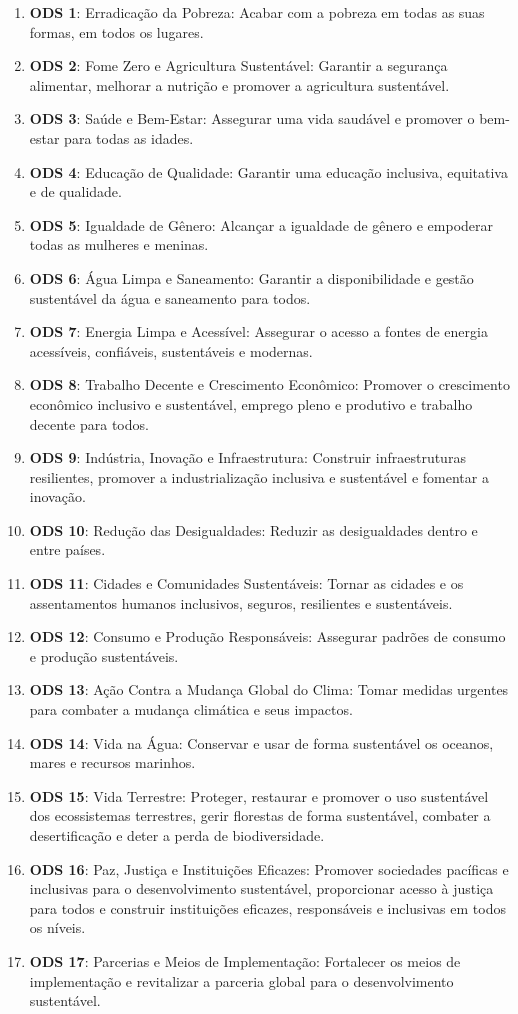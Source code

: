 \begin{enumerate}
    \item \textbf{ODS 1}: Erradicação da Pobreza: Acabar com a pobreza em todas as suas formas, em todos os lugares.
    \item \textbf{ODS 2}: Fome Zero e Agricultura Sustentável: Garantir a segurança alimentar, melhorar a nutrição e promover a agricultura sustentável.
    \item \textbf{ODS 3}: Saúde e Bem-Estar: Assegurar uma vida saudável e promover o bem-estar para todas as idades.
    \item \textbf{ODS 4}: Educação de Qualidade: Garantir uma educação inclusiva, equitativa e de qualidade.
    \item \textbf{ODS 5}: Igualdade de Gênero: Alcançar a igualdade de gênero e empoderar todas as mulheres e meninas.
    \item \textbf{ODS 6}: Água Limpa e Saneamento: Garantir a disponibilidade e gestão sustentável da água e saneamento para todos.
    \item \textbf{ODS 7}: Energia Limpa e Acessível: Assegurar o acesso a fontes de energia acessíveis, confiáveis, sustentáveis e modernas.
    \item \textbf{ODS 8}: Trabalho Decente e Crescimento Econômico: Promover o crescimento econômico inclusivo e sustentável, emprego pleno e produtivo e trabalho decente para todos.
    \item \textbf{ODS 9}: Indústria, Inovação e Infraestrutura: Construir infraestruturas resilientes, promover a industrialização inclusiva e sustentável e fomentar a inovação.
    \item \textbf{ODS 10}: Redução das Desigualdades: Reduzir as desigualdades dentro e entre países.
    \item \textbf{ODS 11}: Cidades e Comunidades Sustentáveis: Tornar as cidades e os assentamentos humanos inclusivos, seguros, resilientes e sustentáveis.
    \item \textbf{ODS 12}: Consumo e Produção Responsáveis: Assegurar padrões de consumo e produção sustentáveis.
    \item \textbf{ODS 13}: Ação Contra a Mudança Global do Clima: Tomar medidas urgentes para combater a mudança climática e seus impactos.
    \item \textbf{ODS 14}: Vida na Água: Conservar e usar de forma sustentável os oceanos, mares e recursos marinhos.
    \item \textbf{ODS 15}: Vida Terrestre: Proteger, restaurar e promover o uso sustentável dos ecossistemas terrestres, gerir florestas de forma sustentável, combater a desertificação e deter a perda de biodiversidade.
    \item \textbf{ODS 16}: Paz, Justiça e Instituições Eficazes: Promover sociedades pacíficas e inclusivas para o desenvolvimento sustentável, proporcionar acesso à justiça para todos e construir instituições eficazes, responsáveis e inclusivas em todos os níveis.
    \item \textbf{ODS 17}: Parcerias e Meios de Implementação: Fortalecer os meios de implementação e revitalizar a parceria global para o desenvolvimento sustentável.
\end{enumerate}

